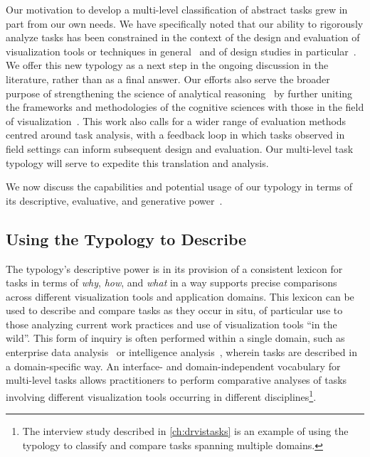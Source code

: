 Our motivation to develop a multi-level classification of abstract tasks grew in part from our own needs.
We have specifically noted that our ability to rigorously analyze tasks has been constrained in the context of the design and evaluation of visualization tools or techniques in general~\cite{Meyer2015,Munzner2014} and of design studies in particular~\cite{Sedlmair2012}.
We offer this new typology as a next step in the ongoing discussion in the literature, rather than as a final answer.
Our efforts also serve the broader purpose of strengthening the science of analytical reasoning~\cite{Thomas2005} by further uniting the frameworks and methodologies of the cognitive sciences with those in the field of visualization~\cite{Pohl2012}.
This work also calls for a wider range of evaluation methods centred around task analysis, with a feedback loop in which tasks observed in field settings can inform subsequent design and evaluation.
Our multi-level task typology will serve to expedite this translation and analysis.

We now discuss the capabilities and potential usage of our typology in terms of its descriptive, evaluative, and generative power~\cite{Beaudouin-Lafon2004,Bederson2003}.


\subsection{Using the Typology to Describe}
\label{typology:discussion:describe}


The typology's descriptive power is in its provision of a consistent lexicon for tasks in terms of {\it why}, {\it how}, and {\it what} in a way supports precise comparisons across different visualization tools and application domains.
This lexicon can be used to describe and compare tasks as they occur in situ, of particular use to those analyzing current work practices and use of visualization tools ``in the wild''.
This form of inquiry is often performed within a single domain, such as enterprise data analysis~\cite{Kandel2012} or intelligence analysis~\cite{Kang2011}, wherein tasks are described in a domain-specific way.
An interface- and domain-independent vocabulary for multi-level tasks allows practitioners to perform comparative analyses of tasks involving different visualization tools occurring in different disciplines\footnote{The interview study described in \autoref{ch:drvistasks} is an example of using the typology to classify and compare tasks spanning multiple domains.}.

